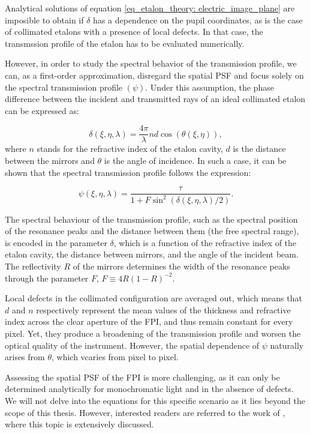 Analytical solutions of equation \eqref{eq_etalon_theory: electric_image_plane} are imposible to obtain if $\delta$ has a dependence on the pupil coordinates, as is the case of collimated etalons with a presence of local defects. In that case, the transmssion profile of the etalon has to be evaluated numerically. 

However, in order to study the spectral behavior of the transmission profile, we can, as a first-order approximation, disregard the spatial PSF and focus solely on the spectral transmission profile $(\psi)$. Under this assumption, the phase difference between the incident and transmitted rays of an ideal collimated etalon can be expressed as:  

\begin{equation}
  \delta (\xi, \eta, \lambda) = \frac{4\pi}{\lambda}nd\cos (\theta(\xi, \eta)),
  \label{eq_etalon_theory: collimated_delta}
\end{equation}
where $n$ stands for the refractive index of the etalon cavity, $d$ is the distance between the mirrors and $\theta$ is the angle of incidence. In such a case, it can be shown that the spectral transmission profile follows the expression: 

\begin{equation}
  \psi\left(\xi, \eta, \lambda \right) = \frac{\tau}{1 + F \sin ^2 (\delta(\xi, \eta, \lambda) / 2)}.
  \label{eq_eta_theory : Collimated_profile}
\end{equation}

The spectral behaviour of the transmission profile, such as the spectral position of the resonance peaks and the distance between them (the free spectral range), is encoded in the parameter $\delta$, which is a function of the refractive index of the etalon cavity, the distance between mirrors, and the angle of the incident beam. The reflectivity $R$ of the mirrors determines the width of the resonance peaks through the parameter $F$, $F \equiv 4R (1 - R )^{-2}$.

Local defects in the collimated configuration are averaged out, which means that $d$ and $n$ respectively represent the mean values of the thickness and refractive index across the clear aperture of the FPI, and thus remain constant for every pixel. Yet, they produce a broadening of the transmission profile and worsen the optical quality of the instrument. However, the spatial dependence of $\psi$ naturally arises from $\theta$, which vcaries from pixel to pixel. 

Assessing the spatial PSF of the FPI is more challenging, as it can only be determined analytically for monochromatic light and in the absence of defects. We will not delve into the equations for this specific scenario as it lies beyond the scope of this thesis. However, interested readers are referred to the work of \cite{franI}, where this topic is extensively discussed.

